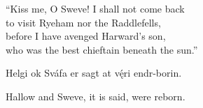 \bvb “Kiss me, O Sweve!  I shall not come back \\
to visit Ryeham nor the Raddlefells, \\
before I have avenged Harward’s son, \\
who was the best chieftain beneath the sun.”\evb\evg


\bpg\bpa{}%
%
Helgi ok Sváfa er sagt at vę́ri endr-borin.\epa

\bpb Hallow and Sweve, it is said, were reborn.\epb\epg

\sectionline
